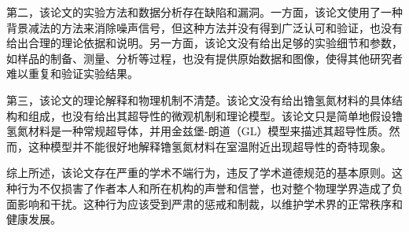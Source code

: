 \documentclass[UTF8]{ctexart}
\begin{document}
第二，该论文的实验方法和数据分析存在缺陷和漏洞。一方面，该论文使用了一种背景减法的方法来消除噪声信号，但这种方法并没有得到广泛认可和验证，也没有给出合理的理论依据和说明。另一方面，该论文没有给出足够的实验细节和参数，如样品的制备、测量、分析等过程，也没有提供原始数据和图像，使得其他研究者难以重复和验证实验结果。

第三，该论文的理论解释和物理机制不清楚。该论文没有给出镥氢氮材料的具体结构和组成，也没有给出其超导性的微观机制和理论模型。该论文只是简单地假设镥氢氮材料是一种常规超导体，并用金兹堡-朗道（GL）模型来描述其超导性质。然而，这种模型并不能很好地解释镥氢氮材料在室温附近出现超导性的奇特现象。

综上所述，该论文存在严重的学术不端行为，违反了学术道德规范的基本原则。这种行为不仅损害了作者本人和所在机构的声誉和信誉，也对整个物理学界造成了负面影响和干扰。这种行为应该受到严肃的惩戒和制裁，以维护学术界的正常秩序和健康发展。
\end{document}
